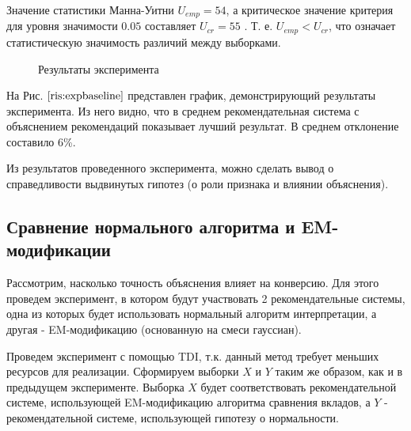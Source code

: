 \documentclass[12pt,a4paper]{report}
\begin{document}
Значение статистики Манна-Уитни $U_{emp} = 54$, а критическое значение критерия для уровня значимости $0.05$ составляет $U_{cr} = 55$ \cite{Mw}. Т. е. $U_{emp} < U_{cr}$, что означает статистическую значимость различий между выборками.

\begin{figure}[H]
\caption{Результаты эксперимента}
\label{ris:expbaseline}
\end{figure}

На Рис. $\ref{ris:expbaseline}$ представлен график, демонстрирующий результаты эксперимента. Из него видно, что в среднем рекомендательная система с объяснением рекомендаций показывает лучший результат. В среднем отклонение составило 6\%.

Из результатов проведенного эксперимента, можно сделать вывод о справедливости выдвинутых гипотез (о роли признака и влиянии объяснения).

\subsection{Сравнение нормального алгоритма и  EM-модификации}
Рассмотрим, насколько точность объяснения влияет на конверсию. Для этого проведем эксперимент, в котором будут участвовать 2 рекомендательные системы, одна из которых будет использовать нормальный алгоритм интерпретации, а другая - EM-модификацию (основанную на смеси гауссиан).

Проведем эксперимент с помощью TDI, т.к. данный метод требует меньших ресурсов для реализации. Сформируем выборки $X$ и $Y$ таким же образом, как и в предыдущем эксперименте. Выборка $X$ будет соответствовать рекомендательной системе, использующей EM-модификацию алгоритма сравнения вкладов, а $Y$ - рекомендательной системе, использующей гипотезу о нормальности. 
\end{document}
